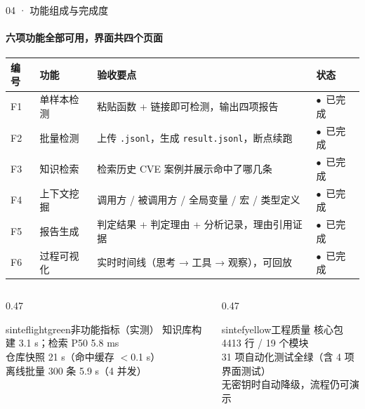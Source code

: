 \documentclass{beamer}
\newcommand{\good}{\textcolor{sintefgreen}{$\bullet$}}
\begin{document}
\begin{frame}{04 · 功能组成与完成度}
\framesubtitle{六项功能全部可用，界面共四个页面}
\tiny
\begin{tabular}{@{}p{}p{}p{}p{}@{}}
\toprule
\textbf{编号} & \textbf{功能} & \textbf{验收要点} & \textbf{状态} \\
\midrule
F1 & 单样本检测 & 粘贴函数 + 链接即可检测，输出四项报告 & \good\ 已完成 \\
F2 & 批量检测 & 上传 \texttt{.jsonl}，生成 \texttt{result.jsonl}，断点续跑 & \good\ 已完成 \\
F3 & 知识检索 & 检索历史 CVE 案例并展示命中了哪几条 & \good\ 已完成 \\
F4 & 上下文挖掘 & 调用方 / 被调用方 / 全局变量 / 宏 / 类型定义 & \good\ 已完成 \\
F5 & 报告生成 & 判定结果 + 判定理由 + 分析记录，理由引用证据 & \good\ 已完成 \\
F6 & 过程可视化 & 实时时间线（思考 → 工具 → 观察），可回放 & \good\ 已完成 \\
\bottomrule
\end{tabular}

\vspace{0.3em}
\begin{columns}[t]
\begin{column}{0.47\textwidth}
\begin{colorblock}[black]{sinteflightgreen}{非功能指标（实测）}
\tiny
知识库构建 3.1 s；检索 P50 5.8 ms\\
仓库快照 21 s（命中缓存 $<$0.1 s）\\
离线批量 300 条 5.9 s（4 并发）
\end{colorblock}
\end{column}
\begin{column}{0.47\textwidth}
\begin{colorblock}[black]{sintefyellow}{工程质量}
\tiny
核心包 4413 行 / 19 个模块\\
31 项自动化测试全绿（含 4 项界面测试）\\
无密钥时自动降级，流程仍可演示
\end{colorblock}
\end{column}
\end{columns}
\end{frame}
\end{document}
